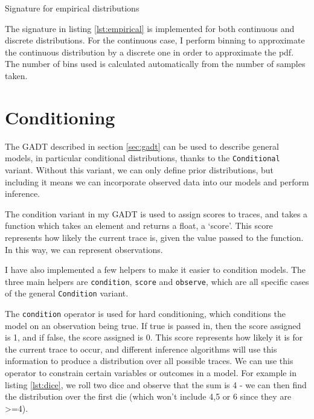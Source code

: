 \begin{listing}[ht]
	\caption{Signature for empirical distributions}
	\label{lst:empirical}
\end{listing}
	
The signature in listing \ref{lst:empirical} is implemented for both continuous and discrete distributions. For the continuous case, I perform binning to approximate the continuous distribution by a discrete one in order to approximate the pdf. The number of bins used is calculated automatically from the number of samples taken.
		
\section{Conditioning} \label{sec:condition}
	
The GADT described in section \ref{sec:gadt} can be used to describe general models, in particular conditional distributions, thanks to the \texttt{Conditional} variant. Without this variant, we can only define prior distributions, but including it means we can incorporate observed data into our models and perform inference.
	
The condition variant in my GADT is used to assign scores to traces, and takes a function which takes an element and returns a float, a `score'. This score represents how likely the current trace is, given the value passed to the function. In this way, we can represent observations.
		
I have also implemented a few helpers to make it easier to condition models. The three main helpers are \texttt{condition}, \texttt{score} and \texttt{observe}, which are all specific cases of the general \texttt{Condition} variant. 
		
The \texttt{condition} operator is used for hard conditioning, which conditions the model on an observation being true. If true is passed in, then the score assigned is 1, and if false, the score assigned is 0. This score represents how likely it is for the current trace to occur, and different inference algorithms will use this information to produce a distribution over all possible traces. We can use this operator to constrain certain variables or outcomes in a model. For example in listing \ref{lst:dice}, we roll two dice and observe that the sum is 4 - we can then find the distribution over the first die (which won't include 4,5 or 6 since they are >=4).
						
